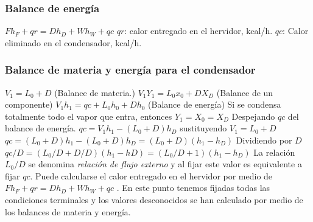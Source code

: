 \documentclass[11pt,openany]{book}
\begin{document}
\subsubsection{Balance de energía}
$F h_F +qr = D h_D + W h_W + qc$
\newline\newline
$qr$: calor entregado en el hervidor, kcal/h.
$qc$: Calor eliminado en el condensador, kcal/h.
\subsubsection{Balance de materia y energía para el condensador}
$V_1 = L_0 + D$ (Balance de materia.)
\newline\newline
$V_1 Y_1= L_0 x_0 + D X_D$ (Balance de un componente)
\newline\newline
$V_1 h_1 = qc + L_0 h_0 + D h_0$ (Balance de energía)
\newline\newline
Si se condensa totalmente todo el vapor que entra, entonces
\newline\newline
$Y_1 = X_0 = X_D$
Despejando $qc$ del balance de energía.
$qc = V_1 h_1 - (L_0+D)h_D$
\newline\newline
sustituyendo $V_1=L_0 +D$
\newline\newline
$qc=(L_0+D)h_1 - (L_0+D)h_D = (L_0+D)(h_1-h_D)$
\newline\newline
Dividiendo por $D$
\newline\newline
$qc/D = (L_0/D + D/D)(h_1-hD)=(L_0/D +1)(h_1-h_D)$
\newline\newline
La relación $L_0/D$ se denomina \textit{relación de flujo externo} y al fijar este valor es equivalente a 
fijar $qc$. Puede calcularse el calor entregado en el hervidor por medio de 
$F h_F + qr = D h_D + W h_W + qc$ . En este punto tenemos fijadas todas las condiciones terminales y los valores 
desconocidos se han calculado por medio de los balances de materia y energía.
\end{document}
